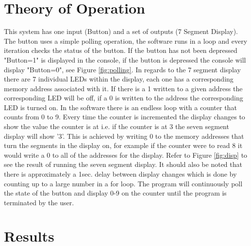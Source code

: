 \documentclass[10pt,a4paper]{article}
\begin{document}
	\section{Theory of Operation}
	This system has one input (Button) and a set of outputs (7 Segment Display). The button uses a simple polling operation, the software runs in a loop and every iteration checks the status of the button. If the button has not been depressed "Button=1" is displayed in the console, if the button is depressed the console will display "Button=0", see Figure \ref{fig:polling}. In regards to the 7 segment display there are 7 individual LEDs within the display, each one has a corresponding memory address associated with it. If there is a 1 written to a given address the corresponding LED will be off, if a 0 is written to the address the corresponding LED is turned on. In the software there is an endless loop with a counter that counts from 0 to 9. Every time the counter is incremented the display changes to show the value the counter is at i.e. if the counter is at 3 the seven segment display will show '3'. This is achieved by writing 0 to the memory addresses that turn the segments in the display on, for example if the counter were to read 8 it would write a 0 to all of the addresses for the display. Refer to Figure \ref{fig:disp} to see the result of running the seven segment display. It should also be noted that there is approximately a 1sec. delay between display changes which is done by counting up to a large number in a for loop. The program will continuously poll the state of the button and display 0-9 on the counter until the program is terminated by the user.
	\section{Results}
\end{document}
